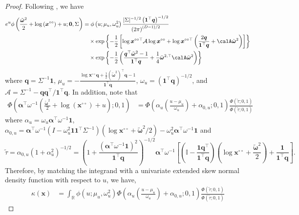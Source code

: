 \documentclass[12pt]{article}
\begin{document}
\begin{proof}
Following \citet{Wadsworth.Tawn:2014}, we have
%
\begin{align*}
e^{u} \phi\left( \frac{\tilde{\bm \omega}^2}{2} + \log\left(\bm x^{\circ\circ}\right) + u; \bm 0, \Sigma\right) &=
\phi \left( u; \mu_u, \omega_u^2 \right) 
\frac{| \Sigma |^{-1/2} \left( \bm 1^\top \bm q\right)^{-1/2}}{\left( 2\pi \right)^{(D-1)/2}} \\
&\quad \times \exp \left\{ -\frac{1}{2} \left[ \log \bm x^{\circ\circ\top} \mathcal{A} \log \bm x^{\circ\circ} + \log \bm x^{\circ\circ\top} \left( \frac{2 \bm q}{\bm 1^\top \bm q} + \calA\tilde{\bm\omega}^2\right) \right]\right\} \\
& \quad \times \exp \left\{- \frac{1}{2} \left( \frac{\bm q^\top\tilde{\bm \omega}^2 - 1}{\bm 1 ^\top \bm q} + \frac{1}{4}\tilde{\bm\omega}^{2,\top}\calA\tilde{\bm\omega}^2\right) \right\}
\end{align*}
%
where $\bm q = \Sigma^{-1} \bm 1$, $\mu_u=-\frac{\log \bm x^{\circ\circ}\bm q + \frac{1}{2} \left(\tilde{\bm \omega}^2\right)^\top \bm q - 1}{\bm 1^\top \bm q}$, $\omega_u=\left( \bm 1^\top \bm q \right)^{-1/2}$, and $\mathcal{A} = \Sigma^{-1} - \bm q \bm q^\top / \bm 1^\top \bm q$. In addition, note that
%
\begin{align*}
\Phi\left( \bm \alpha^\top \omega^{-1} \left( \frac{\tilde{\bm \omega}^2}{2} + \log\left(\bm x^{\circ\circ}\right) + u \right); 0, 1\right) 
&= \Phi\left( \alpha_u\left(\frac{u-\mu_u}{\omega_u}\right) + \alpha_{0,u};0,1\right)\frac{\Phi(\tilde{\tau};0,1)}{\Phi(\tilde{\tau};0,1)}
\end{align*}
where $\alpha_u = \omega_u\bm\alpha^\top\omega^{-1}\bm 1$, $\alpha_{0,u} = \bm\alpha^\top\omega^{-1}\left(I - \omega_u^2\bm 1\bm 1^\top \Sigma^{-1}\right)\left(\log \bm x^{\circ\circ}+\tilde{\bm\omega}^2/2\right) - \omega_u^2\bm\alpha^\top\omega^{-1}\bm 1$ and 
%
\begin{equation}
\label{eq:tilde_tau}
\tilde{\tau} = \alpha_{0,u}(1+\alpha_u^2)^{-1/2}= \left(1 + \frac{(\bm\alpha^\top\omega^{-1}\bm 1)^2}{\bm 1^\top \bm q}\right)^{-1/2}\bm\alpha^\top\omega^{-1}\left[\left(\mathbb{I} - \frac{\bm 1\bm q^\top}{\bm 1^\top\bm q}\right)\left(\log \bm x^{\circ\circ} + \frac{\tilde{\bm\omega}^2}{2}\right) +  \frac{\bm 1}{\bm 1^\top \bm q} \right].
\end{equation}
%
Therefore, by matching the integrand with a univariate extended skew normal density function with respect to $u$,  we have,
\begin{align*}
\kappa(\bm x) &=  \int_{\mathbb R} \phi \left( u; \mu_u, \omega_u^2 \right) \Phi\left( \alpha_u\left(\frac{u-\mu_u}{\omega_u}\right) + \alpha_{0,u};0,1\right)\frac{\Phi(\tilde{\tau};0,1)}{\Phi(\tilde{\tau};0,1)}

\end{align*}
\end{proof}
\end{document}
